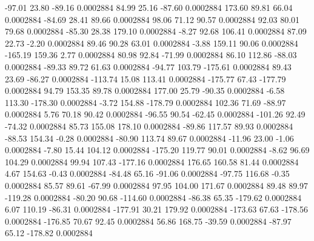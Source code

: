       -97.01       23.80      -89.16     0.0002884
       84.99       25.16      -87.60     0.0002884
      173.60       89.81       66.04     0.0002884
      -84.69       28.41       89.66     0.0002884
       98.06       71.12       90.57     0.0002884
       92.03       80.01       79.68     0.0002884
      -85.30       28.38      179.10     0.0002884
       -8.27       92.68      106.41     0.0002884
       87.09       22.73       -2.20     0.0002884
       89.46       90.28       63.01     0.0002884
       -3.88      159.11       90.06     0.0002884
     -165.19      159.36        2.77     0.0002884
       80.98       92.84      -71.99     0.0002884
       86.10      112.86      -88.03     0.0002884
      -89.33       89.72       61.63     0.0002884
      -94.77      103.79     -175.61     0.0002884
       89.43       23.69      -86.27     0.0002884
     -113.74       15.08      113.41     0.0002884
     -175.77       67.43     -177.79     0.0002884
       94.79      153.35       89.78     0.0002884
      177.00       25.79      -90.35     0.0002884
       -6.58      113.30     -178.30     0.0002884
       -3.72      154.88     -178.79     0.0002884
      102.36       71.69      -88.97     0.0002884
        5.76       70.18       90.42     0.0002884
      -96.55       90.54      -62.45     0.0002884
     -101.26       92.49      -74.32     0.0002884
       85.73      155.08      178.10     0.0002884
      -89.86      117.57       89.93     0.0002884
      -88.53      154.34       -0.28     0.0002884
      -80.90      113.74       89.67     0.0002884
      -11.96       23.00       -1.06     0.0002884
       -7.80       15.44      104.12     0.0002884
     -175.20      119.77       90.01     0.0002884
       -8.62       96.69      104.29     0.0002884
       99.94      107.43     -177.16     0.0002884
      176.65      160.58       81.44     0.0002884
        4.67      154.63       -0.43     0.0002884
      -84.48       65.16      -91.06     0.0002884
      -97.75      116.68       -0.35     0.0002884
       85.57       89.61      -67.99     0.0002884
       97.95      104.00      171.67     0.0002884
       89.48       89.97     -119.28     0.0002884
      -80.20       90.68     -114.60     0.0002884
      -86.38       65.35     -179.62     0.0002884
        6.07      110.19      -86.31     0.0002884
     -177.91       30.21      179.92     0.0002884
     -173.63       67.63     -178.56     0.0002884
     -176.85       70.67       92.45     0.0002884
       56.86      168.75      -39.59     0.0002884
      -87.97       65.12     -178.82     0.0002884
